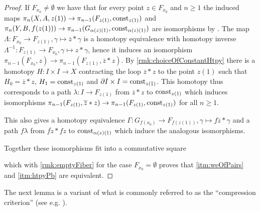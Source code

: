 \begin{lemma}
\begin{proof}
        If $F_{x_0}\neq\emptyset$ we have that for every point $z\in F_{x_0}$ and $n\geq 1$ the induced maps $\pi_n(X,A,z(1))\to \pi_{n-1}(F_{z(1)},\operatorname{const}_{z(1)})$ and $\pi_n(Y,B,f(z(1)))\to \pi_{n-1}(G_{\alpha(z)(1)},\operatorname{const}_{\alpha(z)(1)})$ are isomorphisms by \cite[Theorem 5.1.8]{lectures_htpy_thy}.
        The map $\Lambda\colon F_{x_0}\to F_{z(1)}, \gamma\mapsto \overline{z}*\gamma$ is a homotopy equivalence with homotopy inverse $\Lambda^{-1}\colon F_{z(1)}\to F_{x_0}, \gamma\mapsto z*\gamma$, hence it induces an isomorphism $\pi_{n-1}(F_{x_0},z)\to\pi_{n-1}(F_{z(1)},\overline{z}*z)$.
        By \cref{rmk:choiceOfConstantHtpy} there is a homotopy $H\colon I\times I\to X$ contracting the loop $\overline{z}*z$ to the point $z(1)$ such that $H_0=\overline{z}*z$, $H_1=\operatorname{const}_{z(1)}$ and $\partial I\times I=\operatorname{const}_{z(1)}$.
        This homotopy thus corresponds to a path $\lambda\colon I\to F_{z(1)}$ from $\overline{z}*z$ to $\operatorname{const}_{z(1)}$ which induces isomorphisms $\pi_{n-1}(F_{z(1)},\overline{z}*z)\to\pi_{n-1}(F_{z(1)},\operatorname{const}_{z(1)})$ for all $n\geq 1$.

        This also gives a homotopy equivalence $\Gamma\colon G_{f(x_0)}\to F_{f(z(1))}, \gamma\mapsto f\overline{z}*\gamma$ and a path $f\lambda$ from $\overline{fz}*fz$ to $\operatorname{const}_{\alpha(z)(1)}$ which induce the analogous isomorphisms.
        
        Together these isomorphisms fit into a commutative square
        \begin{center} 
        \end{center}
        which with \cref{rmk:emptyFiber} for the case $F_{x_0}=\emptyset$ proves that \ref{itm:weOfPairs} and \ref{itm:htpyPb} are equivalent.
    \end{proof}
\end{lemma}
The next lemma is a variant of what is commonly referred to as the ``compression criterion'' (see e.g. \cite[343]{hatcher2002algebraic}).
